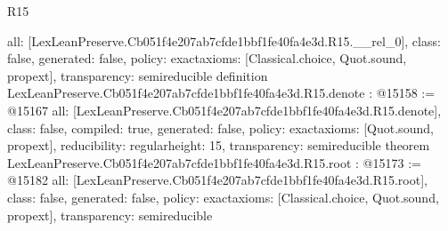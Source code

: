 \begin{lexlean}{R15}
\begin{coremodule}
{  all: [LexLeanPreserve.Cb051f4e207ab7cfde1bbf1fe40fa4e3d.R15.__rel_0],
  class: false,
  generated: false,
  policy: exact{axioms: [Classical.choice, Quot.sound, propext]},
  transparency: semireducible
}
definition LexLeanPreserve.Cb051f4e207ab7cfde1bbf1fe40fa4e3d.R15.denote : @15158 := @15167 {
  all: [LexLeanPreserve.Cb051f4e207ab7cfde1bbf1fe40fa4e3d.R15.denote],
  class: false,
  compiled: true,
  generated: false,
  policy: exact{axioms: [Quot.sound, propext]},
  reducibility: regular{height: 15},
  transparency: semireducible
}
theorem LexLeanPreserve.Cb051f4e207ab7cfde1bbf1fe40fa4e3d.R15.root : @15173 := @15182 {
  all: [LexLeanPreserve.Cb051f4e207ab7cfde1bbf1fe40fa4e3d.R15.root],
  class: false,
  generated: false,
  policy: exact{axioms: [Classical.choice, Quot.sound, propext]},
  transparency: semireducible
}


\end{coremodule}
\end{lexlean}
